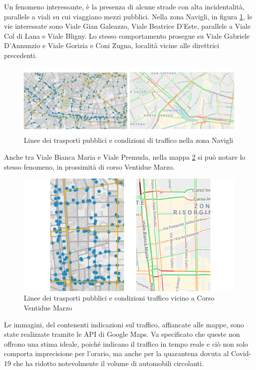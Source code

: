 \documentclass[a4paper,12pt]{report}
\begin{document}
Un fenomeno interessante, è la presenza di alcune strade con alta incidentalità, 
parallele a viali su cui viaggiano mezzi pubblici. 
Nella zona Navigli, in figura \ref{fig:navigli}, le vie 
interessate sono Viale Gian Galeazzo, Viale Beatrice D'Este, 
parallele a Viale Col di Lana e Viale Bligny. 
Lo stesso comportamento prosegue su Viale Gabriele D'Annunzio e Viale Gorizia e Coni Zugna, 
località vicine alle direttrici precedenti. 

\begin{figure}
    \includegraphics[width=\linewidth]{../src/atm/navigli.png}
    \caption{Linee dei trasporti pubblici e condizioni di traffico nella zona Navigli}
    \label{fig:navigli}
\end{figure}

Anche tra Viale Bianca Maria e Viale Premuda, nella mappa \ref{fig:22-marzo} si può 
notare lo stesso fenomeno, in prossimità di corso Ventidue Marzo. 

\begin{figure}
    \includegraphics[width=\linewidth]{../src/atm/22_marzo.png}
    \caption{Linee dei trasporti pubblici e condizioni traffico vicino a Corso Ventidue Marzo}
    \label{fig:22-marzo}
\end{figure}

Le immagini, 
del contenenti indicazioni sul traffico, affiancate alle mappe, 
sono state realizzate tramite le API di 
Google Maps. 
Va specificato che queste non offrono una stima ideale, poiché indicano 
il traffico in tempo reale e ciò non solo comporta imprecisione per l'orario, 
ma anche per 
la quarantena dovuta al Covid-19 che ha ridotto notevolmente il volume di automobili 
circolanti. 
\end{document}

